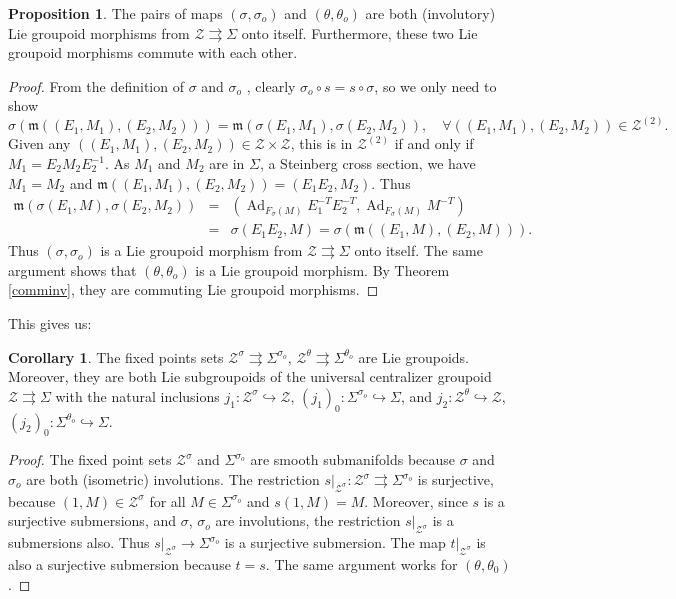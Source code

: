 \documentclass[a4paper,12pt,leqno]{amsart}
\numberwithin{equation}{section}
\theoremstyle{plain}
\theoremstyle{definition}
\DeclareMathOperator{\Ad}{Ad}
\newcommand{\cZ}{\mathcal{Z}}
\newcommand{\fm}{\mathfrak{m}}
\newtheorem{cor}[thm]{Corollary}
\newtheorem{pro}[thm]{Proposition}
\begin{document}
\begin{pro}\label{pro:commute}
The pairs of maps $(\sigma,\sigma_o)$ and $(\theta,\theta_o)$ are both (involutory) Lie groupoid morphisms from $\cZ\rightrightarrows \Sigma$ onto itself. Furthermore, these two Lie groupoid morphisms commute with each other.
\end{pro}

\begin{proof}
From the definition of $\sigma$ and $\sigma_o$ , clearly $\sigma_o\circ s=s\circ\sigma$, so we only need to show
$$\sigma( \fm((E_1,M_1),(E_2,M_2)))=\fm(\sigma(E_1,M_1),\sigma(E_2,M_2)),\quad \forall((E_1,M_1),(E_2,M_2))\in \cZ^{(2)}.$$
Given any $((E_1,M_1),(E_2,M_2))\in \cZ\times \cZ$, this is in $\cZ^{(2)}$ if and only if $M_1=E_2M_2E_2^{-1}$. 
As $M_1$ and $M_2$ are in $\Sigma$, a Steinberg cross section, we have $M_1=M_2$ and
$\fm((E_1,M_1),(E_2,M_2))=(E_1E_2,M_2)$. Thus
\begin{eqnarray*}
\fm(\sigma(E_1,M),\sigma(E_2,M_2))&=& (\Ad_{F_\sigma(M)} E_1^{-T} E_2^{-T}, \Ad_{F_\sigma(M)} M^{-T} )  \\
&=& \sigma(E_1E_2,M)=\sigma(\fm((E_1,M),(E_2,M)) ).
\end{eqnarray*}
Thus $(\sigma,\sigma_o)$ is a Lie groupoid morphism from $\cZ\rightrightarrows \Sigma$ onto itself.
The same argument shows that $(\theta,\theta_o)$ is a Lie groupoid morphism. By Theorem \ref{comminv}, they are commuting Lie groupoid morphisms.
\end{proof}

This gives us:
\begin{cor}\label{cor:fixedpoint_groupoid}
The fixed points sets $ \cZ^{\sigma} \rightrightarrows \Sigma^{\sigma_o} $, $ \cZ^{\theta} \rightrightarrows \Sigma^{\theta_o} $  are Lie groupoids. Moreover, they are both Lie subgroupoids of the universal centralizer groupoid $\cZ\rightrightarrows \Sigma$ with the natural inclusions $j_1:\cZ^{\sigma}\hookrightarrow \cZ$, $(j_1)_0:\Sigma^{\sigma_o}\hookrightarrow \Sigma$, and $j_2:\cZ^{\theta}\hookrightarrow \cZ$, $(j_2)_0:\Sigma^{\theta_o}\hookrightarrow \Sigma$.
\end{cor}
\begin{proof}
The fixed point sets $\cZ^{\sigma}$ and $\Sigma^{\sigma_o}$ are smooth submanifolds because $\sigma$ and $\sigma_o$ are both (isometric) involutions. The restriction $s|_{\cZ^\sigma}:\cZ^\sigma\rightrightarrows \Sigma^{\sigma_o}$  is surjective, because $(1,M)\in\cZ^\sigma$ for all $M\in\Sigma^{\sigma_o}$ and $s(1,M)=M$. Moreover, since $s$ is a surjective submersions, and $\sigma$, $\sigma_o$ are involutions, the restriction $s|_{\cZ^\sigma}$ is a submersions also. Thus $s|_{\cZ^\sigma}\to\Sigma^{\sigma_o}$ is a surjective submersion. The map $t|_{\cZ^\sigma}$ is also a surjective submersion because $t=s$. The same argument works for $(\theta,\theta_0)$.
\end{proof}
\end{document}
